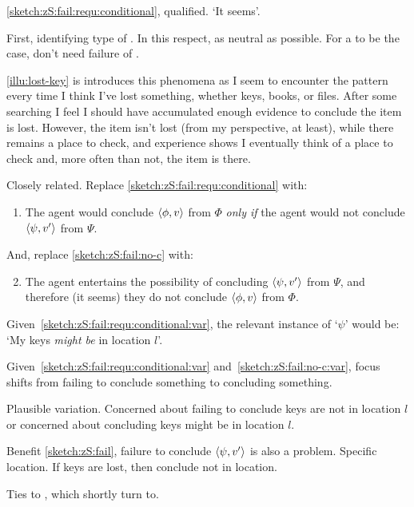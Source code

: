 \begin{note}
  \ref{sketch:zS:fail:requ:conditional}, qualified.
  `It seems'.

  First, identifying type of \scen{}.
  In this respect, as neutral as possible.
  For a \scen{} to be the case, don't need failure of \issueConstraint{}.
\end{note}

\begin{note}
  \autoref{illu:lost-key} is introduces this phenomena as I seem to encounter the pattern every time I think I've lost something, whether keys, books, or files.
  After some searching I feel I should have accumulated enough evidence to conclude the item is lost.
  However, the item isn't lost (from my perspective, at least), while there remains a place to check, and experience shows I eventually think of a place to check and, more often than not, the item is there.
\end{note}

\begin{note}
  Closely related.
  Replace \ref{sketch:zS:fail:requ:conditional} with:
  \begin{enumerate}[label=\alph*\('\)., ref=(\alph*\('\))]
  \item
    \label{sketch:zS:fail:requ:conditional:var}
    The agent would conclude \(\langle \phi, v \rangle\) from \(\Phi\) \emph{only if} the agent would not conclude \(\langle \psi, v' \rangle\) from \(\Psi\).
  \end{enumerate}
  And, replace \ref{sketch:zS:fail:no-c} with:
  \begin{enumerate}[label=\arabic*\('\)., ref=(\arabic*\('\))]
    \setcounter{enumi}{1}
  \item
    \label{sketch:zS:fail:no-c:var}
    The agent entertains the possibility of concluding \(\langle \psi, v' \rangle\) from \(\Psi\), and therefore (it seems) they do not conclude \(\langle \phi, v \rangle\) from \(\Phi\).
  \end{enumerate}

  Given~\ref{sketch:zS:fail:requ:conditional:var}, the relevant instance of `\(\psi\)' would be: `My keys \emph{might be} in location \(l\)'.

  Given~\ref{sketch:zS:fail:requ:conditional:var} and~\ref{sketch:zS:fail:no-c:var}, focus shifts from failing to conclude something to concluding something.

  Plausible variation.
  Concerned about failing to conclude keys are not in location \(l\) or concerned about concluding keys might be in location \(l\).

  Benefit \ref{sketch:zS:fail}, failure to conclude \(\langle \psi, v' \rangle\) is also a problem.
  Specific location.
  If keys are lost, then conclude not in location.

  Ties to , which shortly turn to.
\end{note}

